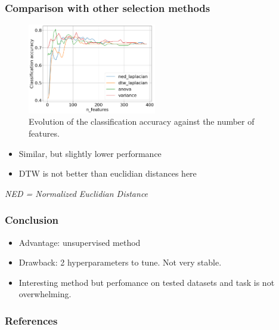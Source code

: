 \documentclass{beamer}
\begin{document}
\begin{frame}
\frametitle{Comparison with other selection methods}

\begin{figure}
    \centering
    \includegraphics[width=0.5\textwidth]{figures/accuracy_vs_n_features.png}
    \caption{Evolution of the classification accuracy against the number of features.}
    \label{fig:accuracy_vs_n_features}
\end{figure}

\begin{itemize}
    \item Similar, but slightly lower performance
    \item DTW is not better than euclidian distances here
\end{itemize}

\medskip
\small{\textit{NED = Normalized Euclidian Distance}}


\end{frame}

\begin{frame}
\frametitle{Conclusion}

\begin{itemize}
    \item Advantage: unsupervised method
    \item Drawback: 2 hyperparameters to tune. Not very stable.
    \item Interesting method but perfomance on tested datasets and task is not overwhelming.
\end{itemize}

\end{frame}

\begin{frame}
\frametitle{References}
\nocite{he_laplacian_2005}
\printbibliography
\end{frame}
\end{document}
